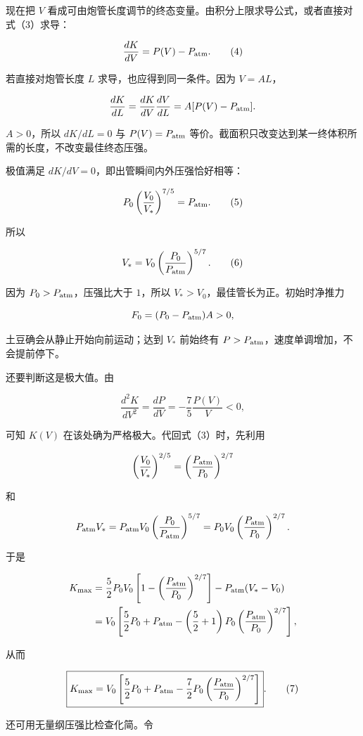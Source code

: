 \documentclass[12pt,a4paper,UTF8]{ctexart}
\begin{document}
现在把 \(V\)
看成可由炮管长度调节的终态变量。由积分上限求导公式，或者直接对式（3）求导：

\[
\frac{dK}{dV}=P(V)-P_{\rm atm}.
\tag{4}
\]

若直接对炮管长度 \(L\) 求导，也应得到同一条件。因为 \(V=AL\)，

\[
\frac{dK}{dL}
=\frac{dK}{dV}\frac{dV}{dL}
=A[P(V)-P_{\rm atm}].
\]

\(A>0\)，所以 \(dK/dL=0\) 与 \(P(V)=P_{\rm atm}\)
等价。截面积只改变达到某一终体积所需的长度，不改变最佳终态压强。

极值满足 \(dK/dV=0\)，即出管瞬间内外压强恰好相等：

\[
P_0\left(\frac{V_0}{V_*}\right)^{7/5}
=P_{\rm atm}.
\tag{5}
\]

所以

\[
V_*=V_0\left(\frac{P_0}{P_{\rm atm}}\right)^{5/7}.
\tag{6}
\]

因为 \(P_0>P_{\rm atm}\)，压强比大于 \(1\)，所以
\(V_*>V_0\)，最佳管长为正。初始时净推力

\[
F_0=(P_0-P_{\rm atm})A>0,
\]

土豆确会从静止开始向前运动；达到 \(V_*\) 前始终有
\(P>P_{\rm atm}\)，速度单调增加，不会提前停下。

还要判断这是极大值。由

\[
\frac{d^2K}{dV^2}=\frac{dP}{dV}
=-\frac75\frac{P(V)}{V}<0,
\]

可知 \(K(V)\) 在该处确为严格极大。代回式（3）时，先利用

\[
\left(\frac{V_0}{V_*}\right)^{2/5}
=\left(\frac{P_{\rm atm}}{P_0}\right)^{2/7}
\]

和

\[
P_{\rm atm}V_*
=P_{\rm atm}V_0
\left(\frac{P_0}{P_{\rm atm}}\right)^{5/7}
=P_0V_0
\left(\frac{P_{\rm atm}}{P_0}\right)^{2/7}.
\]

于是

\[
\begin{aligned}
K_{\max}
&=\frac52P_0V_0
\left[1-\left(\frac{P_{\rm atm}}{P_0}\right)^{2/7}\right]
-P_{\rm atm}(V_*-V_0)\\
&=V_0\left[
\frac52P_0+P_{\rm atm}
-\left(\frac52+1\right)P_0
\left(\frac{P_{\rm atm}}{P_0}\right)^{2/7}
\right],
\end{aligned}
\]

从而

\[
\boxed{
K_{\max}
=V_0\left[
\frac52P_0+P_{\rm atm}
-\frac72P_0
\left(\frac{P_{\rm atm}}{P_0}\right)^{2/7}
\right]
}.
\tag{7}
\]

还可用无量纲压强比检查化简。令
\end{document}
